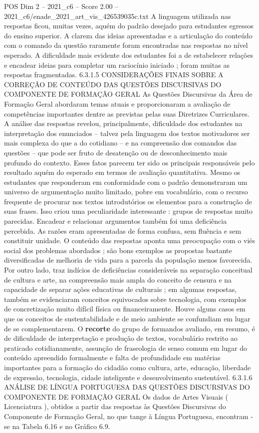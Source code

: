 \begin{textsample}{POS Dim 2 – 2021\_c6 – Score 2.00 – 2021\_c6/enade\_2021\_art\_vis\_426539035c.txt}
A linguagem utilizada nas respostas ficou, muitas vezes, aquém do padrão desejado para estudantes egressos do ensino superior.
A clareza das ideias apresentadas e a articulação do conteúdo com o comando da questão raramente foram encontradas nas respostas no nível esperado.
A dificuldade mais evidente dos estudantes foi a de estabelecer relações e encadear ideias para completar um raciocínio iniciado ; foram muitas as respostas fragmentadas. 6.3.1.5 CONSIDERAÇÕES FINAIS SOBRE A CORREÇÃO DE CONTEÚDO DAS QUESTÕES DISCURSIVAS DO COMPONENTE DE FORMAÇÃO GERAL As Questões Discursivas da Área de Formação Geral abordaram temas atuais e proporcionaram a avaliação de competências importantes dentre as previstas pelas suas Diretrizes Curriculares.
A análise das respostas revelou, principalmente, dificuldade dos estudantes na interpretação dos enunciados – talvez pela linguagem dos textos motivadores ser mais complexa do que a do cotidiano – e na compreensão dos comandos das questões – que pode ser fruto de desatenção ou de desconhecimento mais profundo do contexto.
Esses fatos parecem ter sido os principais responsáveis pelo resultado aquém do esperado em termos de avaliação quantitativa.
Mesmo os estudantes que responderam em conformidade com o padrão demonstraram um universo de argumentação muito limitado, pobre em vocabulário, com o recurso frequente de procurar nos textos introdutórios os elementos para a construção de suas frases.
Isso criou uma peculiaridade interessante : grupos de respostas muito parecidas.
Encadear e relacionar argumentos também foi uma deficiência percebida.
As razões eram apresentadas de forma confusa, sem fluência e sem constituir unidade.
O conteúdo das respostas aponta uma preocupação com o viés social dos problemas abordados ; são bons exemplos as propostas bastante diversificadas de melhoria de vida para a parcela da população menos favorecida.
Por outro lado, traz indícios de deficiências consideráveis na separação conceitual de cultura e arte, na compreensão mais ampla do conceito de censura e na capacidade de separar ações educativas de culturais ; em algumas respostas, também se evidenciaram conceitos equivocados sobre tecnologia, com exemplos de concretização muito difícil física ou financeiramente.
Houve alguns casos em que os conceitos de sustentabilidade e de meio ambiente se confundiam em lugar de se complementarem.
O \textbf{recorte} do grupo de formandos avaliado, em resumo, é de dificuldade de interpretação e produção de textos, vocabulário restrito ao praticado cotidianamente, assunção de fraseologia de senso comum em lugar do conteúdo apreendido formalmente e falta de profundidade em matérias importantes para a formação do cidadão como cultura, arte, educação, liberdade de expressão, tecnologia, cidade inteligente e desenvolvimento sustentável. 6.3.1.6 ANÁLISE DE LÍNGUA PORTUGUESA DAS QUESTÕES DISCURSIVAS DO COMPONENTE DE FORMAÇÃO GERAL Os dados de Artes Visuais ( Licenciatura ), obtidos a partir das respostas às Questões Discursivas do Componente de Formação Geral, no que tange à Língua Portuguesa, encontram -se na Tabela 6.16 e no Gráfico 6.9.

\end{textsample}
